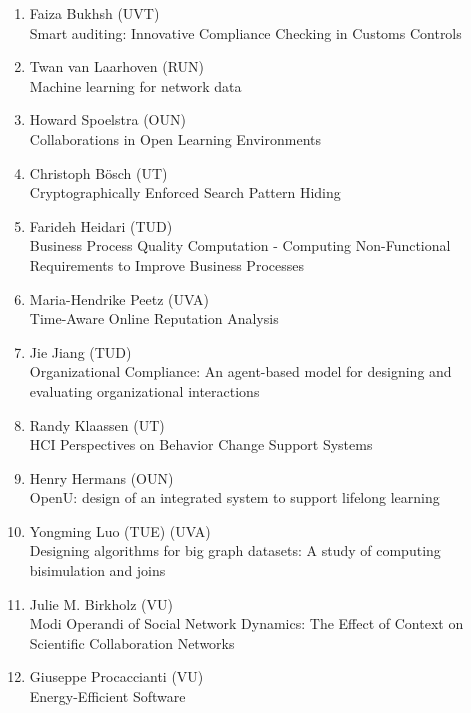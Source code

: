 \begin{multicols}{2}
\begin{scriptsize}
\begin{enumerate}[label=\textbf{2015-\arabic*},leftmargin=0cm,itemindent=1.15cm,labelwidth=\itemindent,labelsep=0cm,align=left,noitemsep]
\item Faiza Bukhsh (UVT)\\
	Smart auditing: Innovative Compliance Checking in Customs Controls	
	
\item Twan van Laarhoven (RUN)\\
	Machine learning for network data 	

\item Howard Spoelstra (OUN)\\
	Collaborations in Open Learning Environments
	
\item Christoph Bösch (UT) \\
	Cryptographically Enforced Search Pattern Hiding
	
\item Farideh Heidari (TUD)\\
	Business Process Quality Computation - Computing Non-Functional Requirements to Improve Business Processes 
	
\item Maria-Hendrike Peetz (UVA) \\
	Time-Aware Online Reputation Analysis
	
\item Jie Jiang (TUD)\\
	Organizational Compliance: An agent-based model for designing and evaluating organizational interactions

\item Randy Klaassen (UT)  \\
	HCI Perspectives on Behavior Change Support Systems

\item Henry Hermans (OUN) \\
	OpenU: design of an integrated system to support lifelong learning
	
\item Yongming Luo (TUE)  (UVA) \\
	Designing algorithms for big graph datasets: A study of computing bisimulation and joins
	
\item Julie M. Birkholz (VU) \\
	Modi Operandi of Social Network Dynamics: The Effect of Context on Scientific Collaboration Networks
	
\item Giuseppe Procaccianti (VU)  \\
	Energy-Efficient Software


\end{enumerate}
\end{scriptsize}
\end{multicols}
